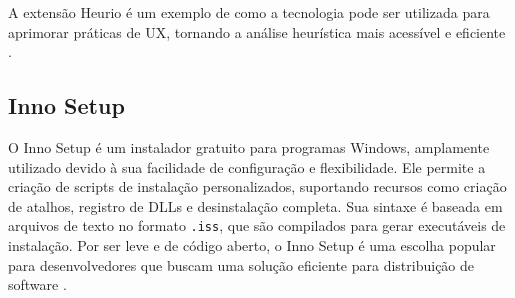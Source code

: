 A extensão Heurio é um exemplo de como a tecnologia pode ser utilizada para aprimorar práticas de UX, tornando a análise heurística mais acessível e eficiente \citep{Heurio}.

\subsection{Inno Setup}
O Inno Setup é um instalador gratuito para programas Windows, amplamente utilizado devido à sua facilidade de configuração e flexibilidade. Ele permite a criação de scripts de instalação personalizados, suportando recursos como criação de atalhos, registro de DLLs e desinstalação completa. Sua sintaxe é baseada em arquivos de texto no formato \texttt{.iss}, que são compilados para gerar executáveis de instalação. Por ser leve e de código aberto, o Inno Setup é uma escolha popular para desenvolvedores que buscam uma solução eficiente para distribuição de software \citep{innosetup}.
